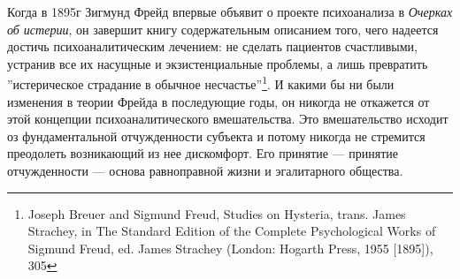 \documentclass[12pt]{book}
\begin{document}
Когда в 1895г Зигмунд Фрейд впервые объявит о проекте психоанализа в \textit{Очерках об истерии}, он завершит книгу содержательным описанием того, чего надеется достичь психоаналитическим лечением: не сделать пациентов счастливыми, устранив все их насущные и экзистенциальные проблемы, а лишь превратить ''истерическое страдание в обычное несчастье''\footnote{Joseph Breuer and Sigmund Freud, Studies on Hysteria, trans. James Strachey, in The Standard Edition of the Complete Psychological Works of Sigmund Freud, ed. James Strachey (London: Hogarth Press, 1955 [1895]), 305}. И какими бы ни были изменения в теории Фрейда в последующие годы, он никогда не откажется от этой концепции психоаналитического вмешательства. Это вмешательство исходит оз фундаментальной отчужденности субъекта и потому никогда не стремится преодолеть возникающий из нее дискомфорт. Его принятие --- принятие отчужденности --- основа равноправной жизни и эгалитарного общества.
\end{document}
